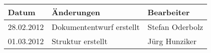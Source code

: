 \begin{tabular}{|l|l|l|}
\hline 
Datum & Änderungen & Bearbeiter \\ 
\hline 
28.02.2012 & Dokumententwurf erstellt & Stefan Oderbolz \\ 
\hline 
01.03.2012 & Struktur erstellt & Jürg Hunziker \\ 
\hline 
\end{tabular} 